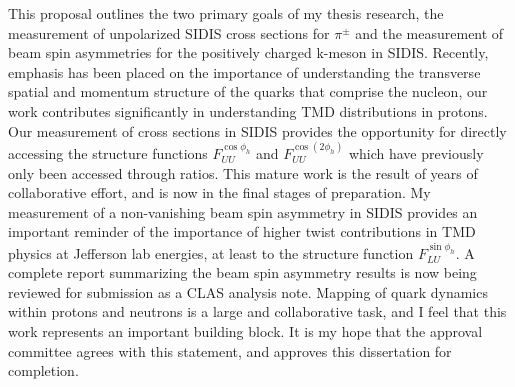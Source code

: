 This proposal outlines the two primary goals of my thesis research, the measurement of unpolarized SIDIS cross sections for $\pi^{\pm}$ and the measurement of beam spin asymmetries for the positively charged k-meson in SIDIS.  Recently, emphasis has been placed on the importance of understanding the transverse spatial and momentum structure of the quarks that comprise the nucleon, our work contributes significantly in understanding TMD distributions in protons.  Our measurement of cross sections in SIDIS provides the opportunity for directly accessing the structure functions $F_{UU}^{\cos\phi_h}$ and $F_{UU}^{\cos(2\phi_h)}$ which have previously only been accessed through ratios.  This mature work is the result of years of collaborative effort, and is now in the final stages of preparation.  My measurement of a non-vanishing beam spin asymmetry in SIDIS provides an important reminder of the importance of higher twist contributions in TMD physics at Jefferson lab energies, at least to the structure function $F_{LU}^{\sin\phi_h}$.  A complete report summarizing the beam spin asymmetry results is now being reviewed for submission as a CLAS analysis note.  Mapping of quark dynamics within protons and neutrons is a large and collaborative task, and I feel that this work represents an important building block.  It is my hope that the approval committee agrees with this statement, and approves this dissertation for completion. 
